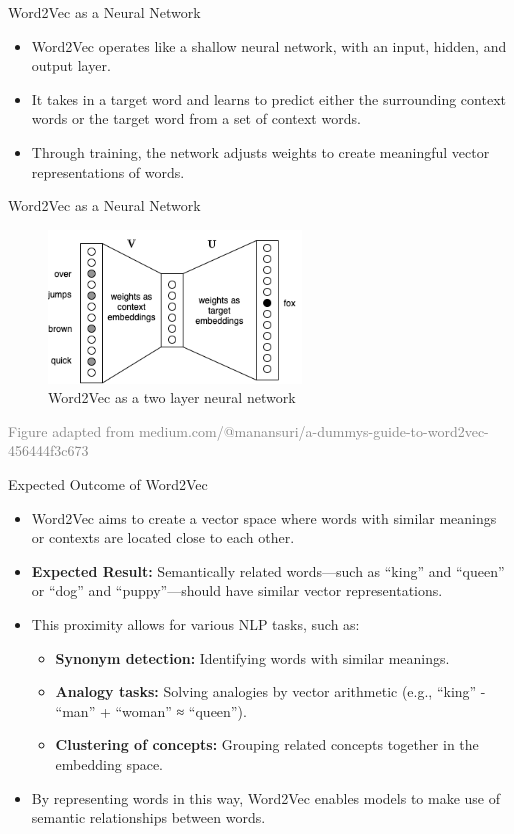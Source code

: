 \documentclass[serif, aspectratio=169]{beamer}
\begin{document}
\begin{frame}{Word2Vec as a Neural Network}
	 \begin{itemize} \item Word2Vec operates like a shallow neural network, with an input, hidden, and output layer. \item It takes in a target word and learns to predict either the surrounding context words or the target word from a set of context words. \item Through training, the network adjusts weights to create meaningful vector representations of words. 
	 \end{itemize} 
\end{frame}


\begin{frame}{Word2Vec as a Neural Network}
	\begin{figure}
		\centering
		\includegraphics[width=0.6\textwidth]{pic/word2vec_nn.png}
		\caption*{Word2Vec as a two layer neural network}
	\end{figure}
	\vspace{0.4cm}
	\hspace{-1.0cm}
	{\tiny \textcolor{gray}{Figure adapted from medium.com/@manansuri/a-dummys-guide-to-word2vec-456444f3c673}}
\end{frame}

\begin{frame}{Expected Outcome of Word2Vec}
	\begin{itemize}
		\item Word2Vec aims to create a vector space where words with similar meanings or contexts are located close to each other.
		\item \textbf{Expected Result:} Semantically related words—such as “king” and “queen” or “dog” and “puppy”—should have similar vector representations.
		\item This proximity allows for various NLP tasks, such as:
		\begin{itemize}
			\item \textbf{Synonym detection:} Identifying words with similar meanings.
			\item \textbf{Analogy tasks:} Solving analogies by vector arithmetic (e.g., “king” - “man” + “woman” ≈ “queen”).
			\item \textbf{Clustering of concepts:} Grouping related concepts together in the embedding space.
		\end{itemize}
		\item By representing words in this way, Word2Vec enables models to make use of semantic relationships between words.
	\end{itemize}
\end{frame}
\end{document}
